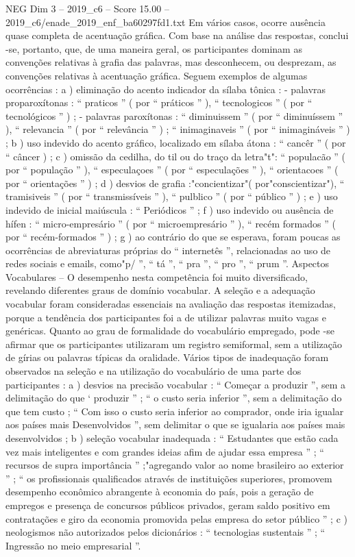 \begin{textsample}{NEG Dim 3 – 2019\_c6 – Score 15.00 – 2019\_c6/enade\_2019\_enf\_ba60297fd1.txt}
Em vários casos, ocorre ausência quase completa de acentuação gráfica.
Com base na análise das respostas, conclui -se, portanto, que, de uma maneira geral, os participantes dominam as convenções relativas à grafia das palavras, mas desconhecem, ou desprezam, as convenções relativas à acentuação gráfica.
Seguem exemplos de algumas ocorrências : a ) eliminação do acento indicador da sílaba tônica : - palavras proparoxítonas : “ praticos ” ( por “ práticos ” ), “ tecnologicos ” ( por “ tecnológicos ” ) ; - palavras paroxítonas : “ diminuissem ” ( por “ diminuíssem ” ), “ relevancia ” ( por “ relevância ” ) ; “ inimaginaveis ” ( por “ inimagináveis ” ) ; b ) uso indevido do acento gráfico, localizado em sílaba átona : “ cancêr ” ( por “ câncer ) ; c ) omissão da cedilha, do til ou do traço da letra"t": “ populacão ” ( por “ população ” ), “ especulaçoes ” ( por “ especulações ” ), “ orientacoes ” ( por “ orientações ” ) ; d ) desvios de grafia :"concientizar"( por"conscientizar"), “ tramisiveis ” ( por “ transmissíveis ” ), “ pulblico ” ( por “ público ” ) ; e ) uso indevido de inicial maiúscula : “ Periódicos ” ; f ) uso indevido ou ausência de hífen : “ micro-empresário ” ( por “ microempresário ” ), “ recém formados ” ( por “ recém-formados ” ) ; g ) ao contrário do que se esperava, foram poucas as ocorrências de abreviaturas próprias do “ internetês ”, relacionadas ao uso de redes sociais e emails, como"p/ ”, “ tá ”, “ pra ”, “ pro ”, “ prum ”.
Aspectos Vocabulares – O desempenho nesta competência foi muito diversificado, revelando diferentes graus de domínio vocabular.
A seleção e a adequação vocabular foram consideradas essenciais na avaliação das respostas itemizadas, porque a tendência dos participantes foi a de utilizar palavras muito vagas e genéricas.
Quanto ao grau de formalidade do vocabulário empregado, pode -se afirmar que os participantes utilizaram um registro semiformal, sem a utilização de gírias ou palavras típicas da oralidade.
Vários tipos de inadequação foram observados na seleção e na utilização do vocabulário de uma parte dos participantes : a ) desvios na precisão vocabular : “ Começar a produzir ”, sem a delimitação do que ‘ produzir ” ; “ o custo seria inferior ”, sem a delimitação do que tem custo ; “ Com isso o custo seria inferior ao comprador, onde iria igualar aos países mais Desenvolvidos ”, sem delimitar o que se igualaria aos países mais desenvolvidos ; b ) seleção vocabular inadequada : “ Estudantes que estão cada vez mais inteligentes e com grandes ideias afim de ajudar essa empresa ” ; “ recursos de supra importância ” ;"agregando valor ao nome brasileiro ao exterior ” ; “ os profissionais qualificados através de instituições superiores, promovem desempenho econômico abrangente à economia do país, pois a geração de empregos e presença de concursos públicos privados, geram saldo positivo em contratações e giro da economia promovida pelas empresa do setor público ” ; c ) neologismos não autorizados pelos dicionários : “ tecnologias sustentais ” ; “ Ingressão no meio empresarial ”.

\end{textsample}
